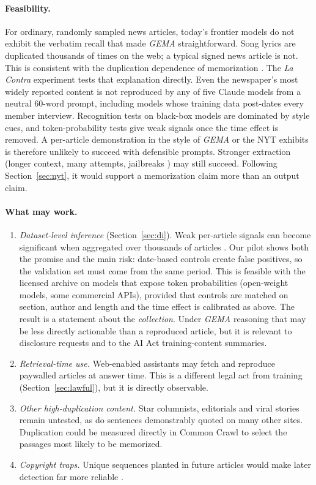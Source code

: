 \documentclass[10pt,a4paper]{article}
\begin{document}
\paragraph{Feasibility.} For ordinary, randomly sampled news articles, today's frontier models do not exhibit the
verbatim recall that made \emph{GEMA} straightforward. Song lyrics are duplicated thousands of times on the web; a
typical signed news article is not. This is consistent with the duplication dependence of memorization
\cite{carlini2023}. The \emph{La Contra} experiment tests that explanation directly. Even the newspaper's most widely
reposted content is not reproduced by any of five Claude models from a neutral 60-word prompt, including models whose
training data post-dates every member interview. Recognition tests on black-box models are dominated by style cues,
and token-probability tests give weak signals once the time effect is removed. A per-article demonstration in the
style of \emph{GEMA} or the NYT exhibits is therefore unlikely to succeed with defensible prompts. Stronger extraction
(longer context, many attempts, jailbreaks \cite{ahmed2026}) may still succeed. Following Section~\ref{sec:nyt}, it
would support a memorization claim more than an output claim.

\paragraph{What may work.}
\begin{enumerate}
\item \emph{Dataset-level inference} (Section~\ref{sec:di}). Weak per-article signals can become significant when
aggregated over thousands of articles \cite{maini2024}. Our pilot shows both the promise and the main risk: date-based
controls create false positives, so the validation set must come from the same period. This is feasible with the licensed archive on models that expose token probabilities
(open-weight models, some commercial APIs), provided that controls are matched on section, author and length and the
time effect is calibrated as above. The result is a statement about the \emph{collection}. Under \emph{GEMA} reasoning
that may be less directly actionable than a reproduced article, but it is relevant to disclosure requests and to the
AI Act training-content summaries.
\item \emph{Retrieval-time use.} Web-enabled assistants may fetch and reproduce paywalled articles at answer time.
This is a different legal act from training (Section~\ref{sec:lawful}), but it is directly observable.
\item \emph{Other high-duplication content.} Star columnists, editorials and viral stories remain untested, as do
sentences demonstrably quoted on many other sites. Duplication could be measured directly in Common Crawl to select
the passages most likely to be memorized.
\item \emph{Copyright traps.} Unique sequences planted in future articles would make later detection far more
reliable \cite{meeus2024}.
\end{enumerate}
\end{document}
